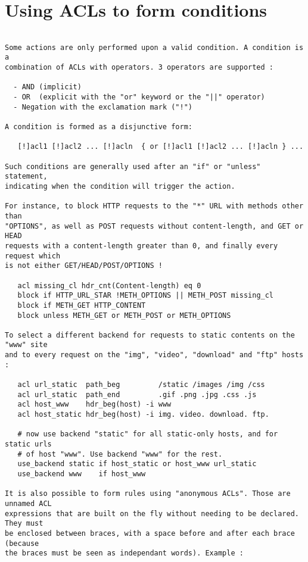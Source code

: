 
\section{Using ACLs to form conditions}

\begin{verbatim}

Some actions are only performed upon a valid condition. A condition is a
combination of ACLs with operators. 3 operators are supported :

  - AND (implicit)
  - OR  (explicit with the "or" keyword or the "||" operator)
  - Negation with the exclamation mark ("!")

A condition is formed as a disjunctive form:

   [!]acl1 [!]acl2 ... [!]acln  { or [!]acl1 [!]acl2 ... [!]acln } ...

Such conditions are generally used after an "if" or "unless" statement,
indicating when the condition will trigger the action.

For instance, to block HTTP requests to the "*" URL with methods other than
"OPTIONS", as well as POST requests without content-length, and GET or HEAD
requests with a content-length greater than 0, and finally every request which
is not either GET/HEAD/POST/OPTIONS !

   acl missing_cl hdr_cnt(Content-length) eq 0
   block if HTTP_URL_STAR !METH_OPTIONS || METH_POST missing_cl
   block if METH_GET HTTP_CONTENT
   block unless METH_GET or METH_POST or METH_OPTIONS

To select a different backend for requests to static contents on the "www" site
and to every request on the "img", "video", "download" and "ftp" hosts :

   acl url_static  path_beg         /static /images /img /css
   acl url_static  path_end         .gif .png .jpg .css .js
   acl host_www    hdr_beg(host) -i www
   acl host_static hdr_beg(host) -i img. video. download. ftp.

   # now use backend "static" for all static-only hosts, and for static urls
   # of host "www". Use backend "www" for the rest.
   use_backend static if host_static or host_www url_static
   use_backend www    if host_www

It is also possible to form rules using "anonymous ACLs". Those are unnamed ACL
expressions that are built on the fly without needing to be declared. They must
be enclosed between braces, with a space before and after each brace (because
the braces must be seen as independant words). Example :


\end{verbatim}

